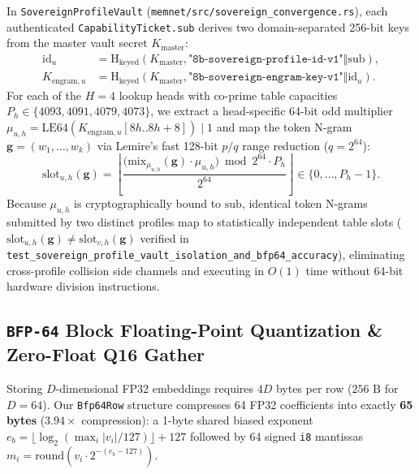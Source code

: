 \documentclass[10pt,twocolumn,letterpaper]{article}
\begin{document}
In \texttt{SovereignProfileVault} (\texttt{memnet/src/sovereign\_convergence.rs}), each authenticated \texttt{CapabilityTicket.sub} derives two domain-separated 256-bit keys from the master vault secret $K_{\text{master}}$:
\begin{align}
    \text{id}_{u} &= \text{H}_{\text{keyed}}(K_{\text{master}}, \texttt{"8b-sovereign-profile-id-v1"} \Vert \text{sub}), \\
    K_{\text{engram}, u} &= \text{H}_{\text{keyed}}(K_{\text{master}}, \texttt{"8b-sovereign-engram-key-v1"} \Vert \text{id}_{u}).
\end{align}
For each of the $H=4$ lookup heads with co-prime table capacities $P_h \in \{4093, 4091, 4079, 4073\}$, we extract a head-specific 64-bit odd multiplier $\mu_{u,h} = \text{LE64}(K_{\text{engram},u}[8h..8h+8]) \mathbin{|} 1$ and map the token N-gram $\mathbf{g} = (w_1, \dots, w_k)$ via Lemire's fast 128-bit $p/q$ range reduction ($q = 2^{64}$):
\begin{equation}
    \text{slot}_{u,h}(\mathbf{g}) = \left\lfloor \frac{\bigl(\text{mix}_{\mu_{u,h}}(\mathbf{g}) \cdot \mu_{u,h}\bigr) \bmod 2^{64} \cdot P_h}{2^{64}} \right\rfloor \in \{0, \dots, P_h - 1\}.
\end{equation}
Because $\mu_{u,h}$ is cryptographically bound to $\text{sub}$, identical token N-grams submitted by two distinct profiles map to statistically independent table slots ($\text{slot}_{u,h}(\mathbf{g}) \neq \text{slot}_{v,h}(\mathbf{g})$ verified in \texttt{test\_sovereign\_profile\_vault\_isolation\_and\_bfp64\_accuracy}), eliminating cross-profile collision side channels and executing in $O(1)$ time without 64-bit hardware division instructions.

\subsection{\texttt{BFP-64} Block Floating-Point Quantization \& Zero-Float Q16 Gather}
Storing $D$-dimensional FP32 embeddings requires $4D$ bytes per row ($256\text{ B}$ for $D=64$). Our \texttt{Bfp64Row} structure compresses 64 FP32 coefficients into exactly \textbf{65 bytes} ($3.94\times$ compression): a 1-byte shared biased exponent $e_b = \lfloor \log_2(\max_i |v_i| / 127) \rfloor + 127$ followed by 64 signed \texttt{i8} mantissas $m_i = \text{round}(v_i \cdot 2^{-(e_b - 127)})$.
\end{document}
